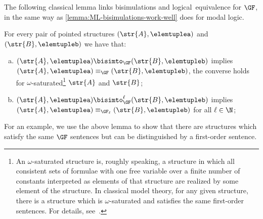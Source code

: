 The following classical lemma links bisimulations and logical~equivalence for $\GF$, in the same way as \cref{lemma:ML-bisimulations-work-well} does for modal logic.
\begin{lemma}\label{lemma:GF-bisimulations-work-well}
For every pair of pointed structures $(\str{A}, \elemtuplea)$ and~$(\str{B}, \elemtupleb)$ we have that:
\begin{enumerate}[(a)]
\item $(\str{A}, \elemtuplea) \bisimto_{\GF} (\str{B}, \elemtupleb)$ implies $(\str{A}, \elemtuplea) \equiv_{\GF} (\str{B}, \elemtupleb)$, the converse holds for $\omega$-saturated\footnote{An $\omega$-saturated structure is, roughly speaking, a structure in which all consistent sets of formulae with one free variable over a finite number of constants interpreted as elements of that structure are realized by some element of the structure. In classical model theory, for any given structure, there is a structure which is $\omega$-saturated and satisfies the same first-order sentences. For details, see~\cite[Chapter 28]{monk1976}.} $\str{A}$ and $\str{B}$;
\item $(\str{A}, \elemtuplea) \bisimto_{\GF}^{\ell} (\str{B}, \elemtupleb)$ implies $(\str{A}, \elemtuplea) \equiv_{\GF_\ell} (\str{B}, \elemtupleb)$ for all $\ell \in \N$;
\end{enumerate}
\end{lemma}
For an example, we use the above lemma to show that there are structures which satisfy the same $\GF$ sentences but can be distinguished by a first-order sentence.
